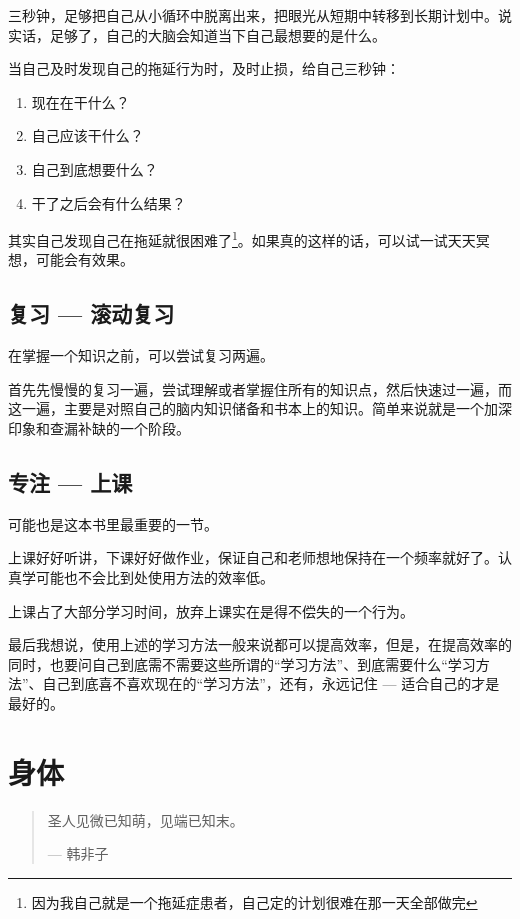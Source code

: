 \documentclass[b5paper]{ctexart}
\begin{document}
			三秒钟，足够把自己从小循环中脱离出来，把眼光从短期中转移到长期计划中。说实话，足够了，自己的大脑会知道当下自己最想要的是什么。

			当自己及时发现自己的拖延行为时，及时止损，给自己三秒钟：
			\begin{enumerate}
				\item 现在在干什么？
				\item 自己应该干什么？
				\item 自己到底想要什么？
				\item 干了之后会有什么结果？
			\end{enumerate}

			其实自己发现自己在拖延就很困难了\footnote{因为我自己就是一个拖延症患者，自己定的计划很难在那一天全部做完}。如果真的这样的话，可以试一试天天冥想，可能会有效果。

		\subsection{复习 --- 滚动复习}
			在掌握一个知识之前，可以尝试复习两遍。

			首先先慢慢的复习一遍，尝试理解或者掌握住所有的知识点，然后快速过一遍，而这一遍，主要是对照自己的脑内知识储备和书本上的知识。简单来说就是一个加深印象和查漏补缺的一个阶段。

		\subsection{专注 --- 上课}
			可能也是这本书里最重要的一节。

			上课好好听讲，下课好好做作业，保证自己和老师想地保持在一个频率就好了。认真学可能也不会比到处使用方法的效率低。

			上课占了大部分学习时间，放弃上课实在是得不偿失的一个行为。

			最后我想说，使用上述的学习方法一般来说都可以提高效率，但是，在提高效率的同时，也要问自己到底需不需要这些所谓的``学习方法''、到底需要什么``学习方法''、自己到底喜不喜欢现在的``学习方法''，还有，永远记住 --- 适合自己的才是最好的。

	\section{身体}\label{Sec::身体}
		\begin{quote}
			圣人见微已知萌，见端已知末。
			\begin{flushright}
				--- 韩非子
			\end{flushright}
		\end{quote}
\end{document}
